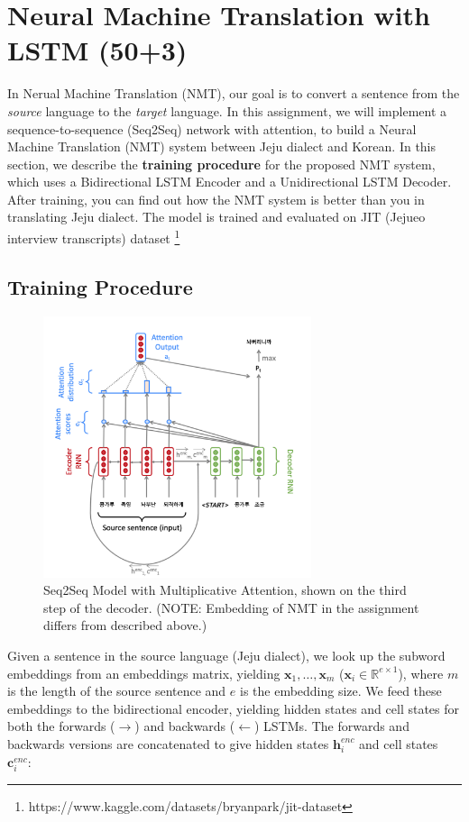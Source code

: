 \documentclass{assignment format}
\begin{document}
\section{Neural Machine Translation with LSTM (50+3)}
 In Nerual Machine Translation (NMT), our goal is to convert a sentence from the \textit{source} language to the \textit{target} language. In this assignment, we will implement a sequence-to-sequence (Seq2Seq) network with attention, to build a Neural Machine Translation (NMT) system between Jeju dialect and Korean. In this section, we describe the \textbf{training procedure} for the proposed NMT system, which uses a Bidirectional LSTM Encoder and a Unidirectional LSTM Decoder. After training, you can find out how the NMT system is better than you in translating Jeju dialect. The model is trained and evaluated on JIT (Jejueo interview transcripts) dataset \footnote{https://www.kaggle.com/datasets/bryanpark/jit-dataset}
 \subsection{Training Procedure}
\begin{figure}[h]
    \begin{center}
        \captionsetup{width=0.8\textwidth}
        \includegraphics[width=0.7\textwidth]{nmt.png}
        \caption{Seq2Seq Model with Multiplicative Attention, shown on the third step of the decoder.  (NOTE: Embedding of NMT in the assignment differs from described above.)
        }
        \label{nmt-figure}
    \end{center}
\end{figure}
Given a sentence in the source language (Jeju dialect), we look up the subword embeddings from an embeddings matrix, yielding $\mathbf{x}_1, \dots, \mathbf{x}_m$ ($\mathbf{x}_i \in \mathbb{R}^{e \times 1}$), where $m$ is the length of the source sentence and $e$ is the embedding size. We feed these embeddings to the bidirectional encoder, yielding hidden states and cell states for both the forwards ($\rightarrow$) and backwards ($\leftarrow$) LSTMs. The forwards and backwards versions are concatenated to give hidden states $\mathbf{h}^{enc}_i$ and cell states $\mathbf{c}^{enc}_i$:
\end{document}
